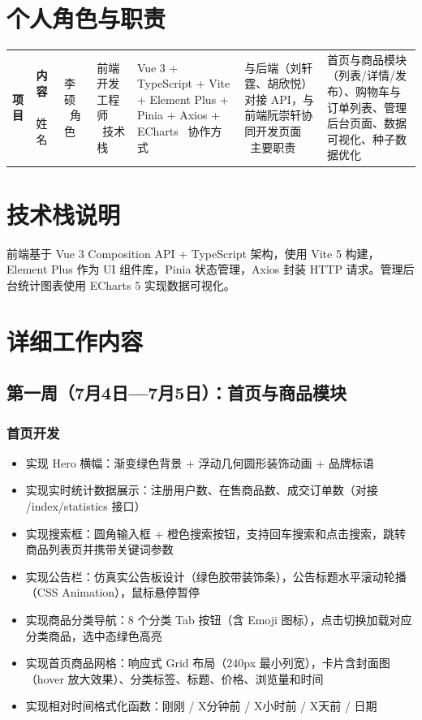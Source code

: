 \documentclass[12pt,a4paper]{ctexart}
\title{{\Huge 前端开发工作汇报}\[0.3cm]{\Large 校园二手物品交易平台——转转}}
\author{{\large 李硕}\{\small 前端开发工程师}}
\date{2026年7月4日 — 2026年7月10日}
\begin{document}
\maketitle
\thispagestyle{fancy}

\section{个人角色与职责}

\begin{table}[H]
\centering
\begin{tabular}{lp{10cm}}
\toprule
\textbf{项目} & \textbf{内容} \
\midrule
姓名 & 李硕 \
角色 & 前端开发工程师 \
技术栈 & Vue 3 + TypeScript + Vite + Element Plus + Pinia + Axios + ECharts \
协作方式 & 与后端（刘轩霆、胡欣悦）对接 API，与前端阮崇轩协同开发页面 \
主要职责 & 首页与商品模块（列表/详情/发布）、购物车与订单列表、管理后台页面、数据可视化、种子数据优化 \
\bottomrule
\end{tabular}
\end{table}

\section{技术栈说明}

前端基于 Vue 3 Composition API + TypeScript 架构，使用 Vite 5 构建，Element Plus 作为 UI 组件库，Pinia 状态管理，Axios 封装 HTTP 请求。管理后台统计图表使用 ECharts 5 实现数据可视化。

\section{详细工作内容}

\subsection{第一周（7月4日—7月5日）：首页与商品模块}

\subsubsection*{首页开发}
\begin{itemize}
    \item 实现 Hero 横幅：渐变绿色背景 + 浮动几何圆形装饰动画 + 品牌标语
    \item 实现实时统计数据展示：注册用户数、在售商品数、成交订单数（对接 /index/statistics 接口）
    \item 实现搜索框：圆角输入框 + 橙色搜索按钮，支持回车搜索和点击搜索，跳转商品列表页并携带关键词参数
    \item 实现公告栏：仿真实公告板设计（绿色胶带装饰条），公告标题水平滚动轮播（CSS Animation），鼠标悬停暂停
    \item 实现商品分类导航：8 个分类 Tab 按钮（含 Emoji 图标），点击切换加载对应分类商品，选中态绿色高亮
    \item 实现首页商品网格：响应式 Grid 布局（240px 最小列宽），卡片含封面图（hover 放大效果）、分类标签、标题、价格、浏览量和时间
    \item 实现相对时间格式化函数：刚刚 / X分钟前 / X小时前 / X天前 / 日期
\end{itemize}
\end{document}
